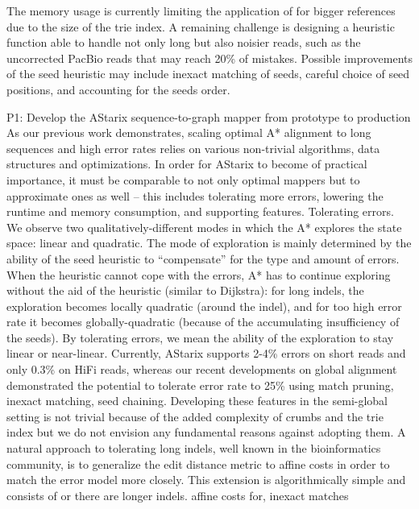 The memory usage is currently limiting the application of \astarix for bigger
references due to the size of the trie index. A remaining challenge is designing
a heuristic function able to handle not only long but also noisier reads, such
as the uncorrected PacBio reads that may reach 20\% of mistakes. Possible
improvements of the seed heuristic may include inexact matching of seeds,
careful choice of seed positions, and accounting for the seeds order.

P1: Develop the AStarix sequence-to-graph mapper from prototype to production
As our previous work demonstrates, scaling optimal A* alignment to long sequences and high error rates relies on various non-trivial algorithms, data structures and optimizations. In order for AStarix to become of practical importance, it must be comparable to not only optimal mappers but to approximate ones as well – this includes tolerating more errors, lowering the runtime and memory consumption, and supporting features.
Tolerating errors. We observe two qualitatively-different modes in which the A* explores the state space: linear and quadratic. The mode of exploration is mainly determined by the ability of the seed heuristic to “compensate” for the type and amount of errors. When the heuristic cannot cope with the errors, A* has to continue exploring without the aid of the heuristic (similar to Dijkstra): for long indels, the exploration becomes locally quadratic (around the indel), and for too high error rate it becomes globally-quadratic (because of the accumulating insufficiency of the seeds). By tolerating errors, we mean the ability of the exploration to stay linear or near-linear. Currently, AStarix supports 2-4\% errors on short reads and only 0.3\% on HiFi reads, whereas our recent developments on global alignment demonstrated the potential to tolerate error rate to 25\% using match pruning, inexact matching, seed chaining. Developing these features in the semi-global setting is not trivial because of the added complexity of crumbs and the trie index but we do not envision any fundamental reasons against adopting them. A natural approach to tolerating long indels, well known in the bioinformatics community, is to generalize the edit distance metric to affine costs in order to match the error model more closely. This extension is algorithmically simple and consists of or there are longer indels. affine costs for, inexact matches
